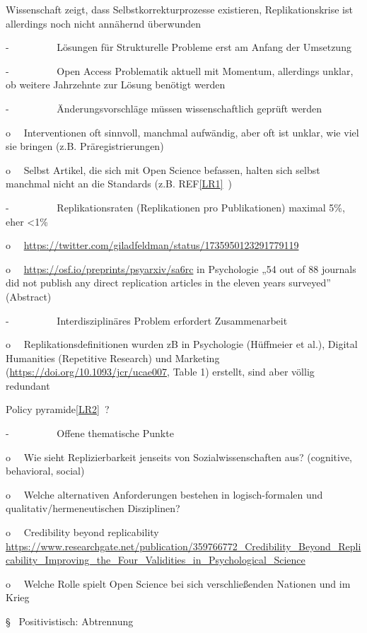\documentclass[
  letterpaper,
  DIV=11,
  numbers=noendperiod]{scrreprt}
\begin{document}
Wissenschaft zeigt, dass Selbstkorrekturprozesse existieren,
Replikationskrise ist allerdings noch nicht annähernd überwunden

-~~~~~~~~~ Lösungen für Strukturelle Probleme erst am Anfang der
Umsetzung

-~~~~~~~~~ Open Access Problematik aktuell mit Momentum, allerdings
unklar, ob weitere Jahrzehnte zur Lösung benötigt werden

-~~~~~~~~~ Änderungsvorschläge müssen wissenschaftlich geprüft werden

o~~ Interventionen oft sinnvoll, manchmal aufwändig, aber oft ist
unklar, wie viel sie bringen (z.B. Präregistrierungen)

o~~ Selbst Artikel, die sich mit Open Science befassen, halten sich
selbst manchmal nicht an die Standards (z.B.
REF\hyperref[_msocom_1]{{[}LR1{]}}~)

-~~~~~~~~~ Replikationsraten (Replikationen pro Publikationen) maximal
5\%, eher \textless1\%

o~~ \url{https://twitter.com/giladfeldman/status/1735950123291779119}

o~~ \url{https://osf.io/preprints/psyarxiv/sa6rc} in Psychologie „54 out
of 88 journals did not publish any direct replication articles in the
eleven years surveyed'' (Abstract)

-~~~~~~~~~ Interdisziplinäres Problem erfordert Zusammenarbeit

o~~ Replikationsdefinitionen wurden zB in Psychologie (Hüffmeier et
al.), Digital Humanities (Repetitive Research) und Marketing
(\url{https://doi.org/10.1093/jcr/ucae007}, Table 1) erstellt, sind aber
völlig redundant

Policy pyramide\hyperref[_msocom_2]{{[}LR2{]}}~?

-~~~~~~~~~ Offene thematische Punkte

o~~ Wie sieht Replizierbarkeit jenseits von Sozialwissenschaften aus?
(cognitive, behavioral, social)

o~~ Welche alternativen Anforderungen bestehen in logisch-formalen und
qualitativ/hermeneutischen Disziplinen?

o~~ Credibility beyond replicability
\url{https://www.researchgate.net/publication/359766772_Credibility_Beyond_Replicability_Improving_the_Four_Validities_in_Psychological_Science}

o~~ Welche Rolle spielt Open Science bei sich verschließenden Nationen
und im Krieg

§~ Positivistisch: Abtrennung
\end{document}
